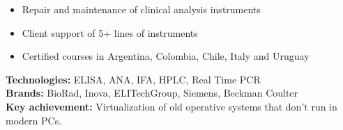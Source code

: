 \documentclass[10pt,a4paper]{altacv}
\begin{document}
\divider

\begin{itemize}
    \item Repair and maintenance of clinical analysis instruments
    \item Client support of 5+ lines of instruments
    \item Certified courses in Argentina, Colombia, Chile, Italy and Uruguay
\end{itemize}
\small{
\textbf{Technologies:} ELISA, ANA, IFA, HPLC, Real Time PCR \\
\textbf{Brands:} BioRad, Inova, ELITechGroup, Siemens, Beckman Coulter \\
\textbf{Key achievement:} Virtualization of old operative systems that don’t run in modern PCs. \\
}
\end{document}
